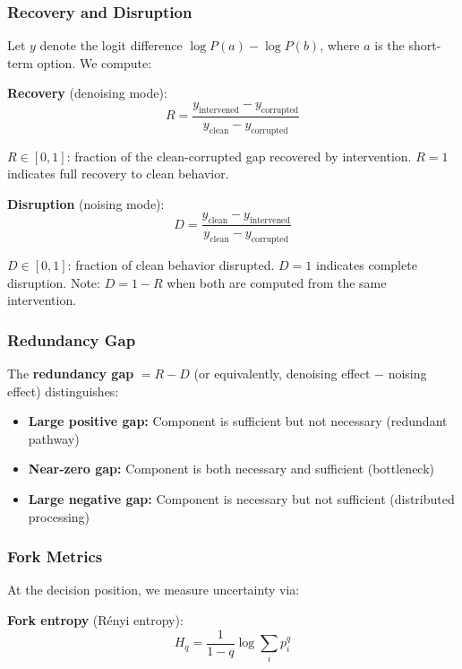 \documentclass{article}
\begin{document}
\subsubsection{Recovery and Disruption}

Let $y$ denote the logit difference $\log P(a) - \log P(b)$, where $a$ is the short-term option. We compute:

\textbf{Recovery} (denoising mode):
\begin{equation}
R = \frac{y_{\text{intervened}} - y_{\text{corrupted}}}{y_{\text{clean}} - y_{\text{corrupted}}}
\end{equation}

$R \in [0, 1]$: fraction of the clean-corrupted gap recovered by intervention. $R = 1$ indicates full recovery to clean behavior.

\textbf{Disruption} (noising mode):
\begin{equation}
D = \frac{y_{\text{clean}} - y_{\text{intervened}}}{y_{\text{clean}} - y_{\text{corrupted}}}
\end{equation}

$D \in [0, 1]$: fraction of clean behavior disrupted. $D = 1$ indicates complete disruption. Note: $D = 1 - R$ when both are computed from the same intervention.

\subsubsection{Redundancy Gap}

The \textbf{redundancy gap} $= R - D$ (or equivalently, denoising effect $-$ noising effect) distinguishes:
\begin{itemize}
    \item \textbf{Large positive gap:} Component is sufficient but not necessary (redundant pathway)
    \item \textbf{Near-zero gap:} Component is both necessary and sufficient (bottleneck)
    \item \textbf{Large negative gap:} Component is necessary but not sufficient (distributed processing)
\end{itemize}

\subsubsection{Fork Metrics}

At the decision position, we measure uncertainty via:

\textbf{Fork entropy} (Rényi entropy):
\begin{equation}
H_q = \frac{1}{1-q} \log \sum_i p_i^q
\end{equation}
\end{document}
